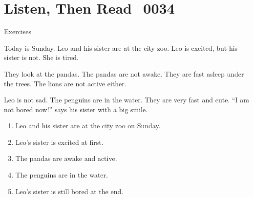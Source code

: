\documentclass[aspectratio=169,xcolor={dvipsnames,table}]{beamer}
\newcommand{\myaudio}[1]{\href{#1}{\faVolumeUp}}
\begin{document}
\section{Listen, Then Read\,\,\,\,\,{\tiny 0034}\,{\scriptsize \myaudio{./audio/006_negative_be_reading.mp3}}}
\begin{frame}[plain,t]{Exercises}
\begin{tcolorbox}[colframe=ForestGreen,
  colback=NavyBlue!10!white,
  colbacktitle=NavyBlue!40!white,
  coltitle=black, %
before upper={\setlength{\parindent}{1.25em}},
 title={A Visit to the City Zoo\hfill{\tiny 0034}\quad{\scriptsize \myaudio{./audio/006_negative_be_reading.mp3}}}
]
\noindent{}Today is Sunday.
 Leo and his sister are at the city zoo.
 Leo is excited, but his sister is not. She is tired.

They look at the pandas.
 The pandas are not awake.
 They are fast asleep under the trees.
 The lions are not active either.

Leo is not sad.
 The penguins are in the water. 
They are very fast and cute. ``I am not bored now!'' says his sister with a big smile.
\end{tcolorbox}

\vspace{-4pt}
\vspace{-11pt}
\begin{enumerate}\setlength{\itemsep}{-3.2pt}
\item<2-> Leo and his sister are at the city zoo on Sunday.\hfill{}
\item<2-> Leo's sister is excited at first.\hfill\visible<4->{F}
\item<2-> The pandas are awake and active.\hfill{}
\item<2-> The penguins are in the water.\hfill{}
\item<2-> Leo's sister is still bored at the end.\hfill{}
\end{enumerate}
\end{frame}
\end{document}
